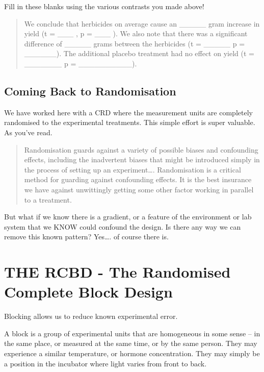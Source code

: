 \documentclass[
]{book}
\begin{document}
Fill in these blanks using the various contrasts you made above!

\begin{quote}
We conclude that herbicides on average cause an \_\_\_\_\_ gram increase in yield (t = \_\_\_ , p = \_\_\_ ). We also note that there was a significant difference of \_\_\_\_\_ grams between the herbicides (t = \_\_\_\_\_ p = \_\_\_\_\_\_). The additional placebo treatment had no effect on yield (t = \_\_\_\_\_\_\_ p = \_\_\_\_\_\_\_\_\_\_).
\end{quote}

\hypertarget{coming-back-to-randomisation}{%
\subsection{Coming Back to Randomisation}\label{coming-back-to-randomisation}}

We have worked here with a CRD where the measurement units are completely randomised to the experimental treatments. This simple effort is super valuable. As you've read.

\begin{quote}
Randomisation guards against a variety of possible biases and confounding effects, including the inadvertent biases that might be introduced simply in the process of setting up an experiment\ldots. Randomisation is a critical method for guarding against confounding effects. It is the best insurance we have against unwittingly getting some other factor working in parallel to a treatment.
\end{quote}

But what if we know there is a gradient, or a feature of the environment or lab system that we KNOW could confound the design. Is there any way we can remove this known pattern? Yes\ldots. of course there is.

\hypertarget{the-rcbd---the-randomised-complete-block-design}{%
\section{THE RCBD - The Randomised Complete Block Design}\label{the-rcbd---the-randomised-complete-block-design}}

Blocking allows us to reduce known experimental error.

A block is a group of experimental units that are homogeneous in some sense -- in the same place, or measured at the same time, or by the same person. They may experience a similar temperature, or hormone concentration. They may simply be a position in the incubator where light varies from front to back.
\end{document}

